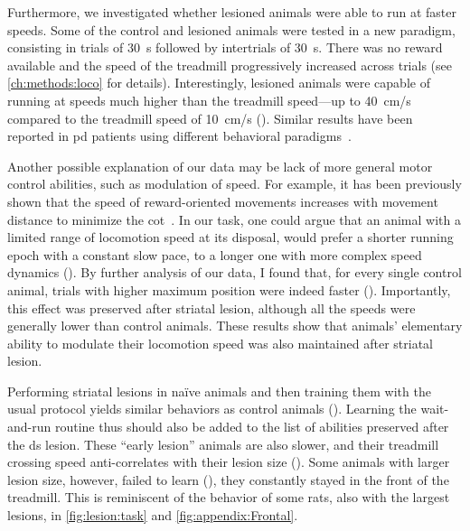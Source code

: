 Furthermore, we investigated whether lesioned animals were able to run at faster speeds.
Some of the control and lesioned animals were tested in a new paradigm, consisting in trials of 30~s followed by intertrials of 30~s.
There was no reward available and the speed of the treadmill progressively increased across trials (see \autoref{ch:methods:loco} for details).
Interestingly, lesioned animals were capable of running at speeds much higher than the treadmill speed---up to 40~cm/s compared to the treadmill speed of 10~cm/s ().
Similar results have been reported in \gls{pd} patients using different behavioral paradigms~\cite{Mazzoni2007, Schmidt2008Brain}.
\par
Another possible explanation of our data may be lack of more general motor control abilities, such as modulation of speed.
For example, it has been previously shown that the speed of reward-oriented movements increases with movement distance to minimize the \gls{cot}~\cite{Shadmehr2010Jneurosci}.
In our task, one could argue that an animal with a limited range of locomotion speed at its disposal, would prefer a shorter running epoch with a constant slow pace, to a longer one with more complex speed dynamics ().
By further analysis of our data, I found that, for every single control animal, trials with higher maximum position were indeed faster ().
Importantly, this effect was preserved after striatal lesion, although all the speeds were generally lower than control animals.
These results show that animals' elementary ability to modulate their locomotion speed was also maintained after striatal lesion.
\par
Performing striatal lesions in na\"{i}ve animals and then training them with the usual protocol yields similar behaviors as control animals ().
Learning the wait-and-run routine thus should also be added to the list of abilities preserved after the \gls{ds} lesion.
These ``early lesion'' animals are also slower, and their treadmill crossing speed anti-correlates with their lesion size ().
Some animals with larger lesion size, however, failed to learn (), they constantly stayed in the front of the treadmill.
This is reminiscent of the behavior of some rats, also with the largest lesions, in \autoref{fig:lesion:task} and \autoref{fig:appendix:Frontal}.

